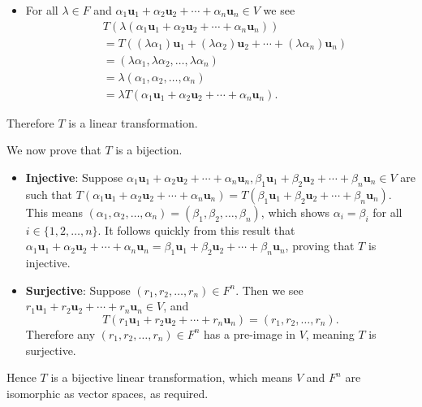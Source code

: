 \begin{questions}
\begin{itemize}
        \item For all $\lambda \in F$ and $\alpha_1\mathbf{u}_1 + \alpha_2\mathbf{u}_2 + \cdots + \alpha_n\mathbf{u}_n \in V$ we see
        \begin{align*}
            &T(\lambda(\alpha_1\mathbf{u}_1 + \alpha_2\mathbf{u}_2 + \cdots + \alpha_n\mathbf{u}_n))\\
            &= T((\lambda\alpha_1)\mathbf{u}_1 + (\lambda\alpha_2)\mathbf{u}_2 + \cdots + (\lambda\alpha_n)\mathbf{u}_n)\\
            &= (\lambda\alpha_1, \lambda\alpha_2, \dots, \lambda\alpha_n)\\
            &= \lambda(\alpha_1, \alpha_2, \dots, \alpha_n)\\
            &= \lambda T(\alpha_1\mathbf{u}_1 + \alpha_2\mathbf{u}_2 + \cdots + \alpha_n\mathbf{u}_n).
        \end{align*}
    \end{itemize}
    Therefore $T$ is a linear transformation.

    We now prove that $T$ is a bijection.
    \begin{itemize}
        \item \textbf{Injective}: Suppose $\alpha_1\mathbf{u}_1 + \alpha_2\mathbf{u}_2 + \cdots + \alpha_n\mathbf{u}_n, \beta_1\mathbf{u}_1 + \beta_2\mathbf{u}_2 + \cdots + \beta_n\mathbf{u}_n \in V$ are such that $T(\alpha_1\mathbf{u}_1 + \alpha_2\mathbf{u}_2 + \cdots + \alpha_n\mathbf{u}_n) = T(\beta_1\mathbf{u}_1 + \beta_2\mathbf{u}_2 + \cdots + \beta_n\mathbf{u}_n)$. This means $(\alpha_1, \alpha_2, \dots, \alpha_n) = (\beta_1, \beta_2, \dots, \beta_n)$, which shows $\alpha_i = \beta_i$ for all $i \in \{1, 2, \dots, n\}$. It follows quickly from this result that $\alpha_1\mathbf{u}_1 + \alpha_2\mathbf{u}_2 + \cdots + \alpha_n\mathbf{u}_n = \beta_1\mathbf{u}_1 + \beta_2\mathbf{u}_2 + \cdots + \beta_n\mathbf{u}_n$, proving that $T$ is injective.

        \item \textbf{Surjective}: Suppose $(r_1, r_2, \dots, r_n) \in F^n$. Then we see $r_1\mathbf{u}_1 + r_2\mathbf{u}_2 + \cdots + r_n\mathbf{u}_n \in V$, and
        \[
            T(r_1\mathbf{u}_1 + r_2\mathbf{u}_2 + \cdots + r_n\mathbf{u}_n) = (r_1, r_2, \dots, r_n).
        \]
        Therefore any $(r_1, r_2, \dots, r_n) \in F^n$ has a pre-image in $V$, meaning $T$ is surjective.
    \end{itemize}
    Hence $T$ is a bijective linear transformation, which means $V$ and $F^n$ are isomorphic as vector spaces, as required.
\end{questions}
